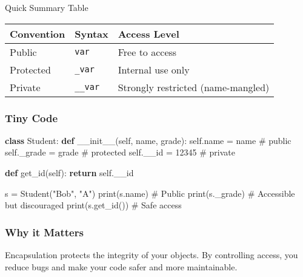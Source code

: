 \documentclass[
  letterpaper,
  DIV=11,
  numbers=noendperiod]{scrreprt}
\newenvironment{Shaded}{\begin{snugshade}}{\end{snugshade}}
\newcommand{\BuiltInTok}[1]{\textcolor[rgb]{0.00,0.23,0.31}{#1}}
\newcommand{\CommentTok}[1]{\textcolor[rgb]{0.37,0.37,0.37}{#1}}
\newcommand{\ControlFlowTok}[1]{\textcolor[rgb]{0.00,0.23,0.31}{\textbf{#1}}}
\newcommand{\DecValTok}[1]{\textcolor[rgb]{0.68,0.00,0.00}{#1}}
\newcommand{\FunctionTok}[1]{\textcolor[rgb]{0.28,0.35,0.67}{#1}}
\newcommand{\KeywordTok}[1]{\textcolor[rgb]{0.00,0.23,0.31}{\textbf{#1}}}
\newcommand{\NormalTok}[1]{\textcolor[rgb]{0.00,0.23,0.31}{#1}}
\newcommand{\OperatorTok}[1]{\textcolor[rgb]{0.37,0.37,0.37}{#1}}
\newcommand{\StringTok}[1]{\textcolor[rgb]{0.13,0.47,0.30}{#1}}
\newcommand{\VariableTok}[1]{\textcolor[rgb]{0.07,0.07,0.07}{#1}}
\begin{document}
Quick Summary Table

\begin{longtable}[]{@{}lll@{}}
\toprule\noalign{}
Convention & Syntax & Access Level \\
\midrule\noalign{}
\endhead
\bottomrule\noalign{}
\endlastfoot
Public & \texttt{var} & Free to access \\
Protected & \texttt{\_var} & Internal use only \\
Private & \texttt{\_\_var} & Strongly restricted (name-mangled) \\
\end{longtable}

\subsubsection{Tiny Code}\label{tiny-code-67}

\begin{Shaded}
\begin{Highlighting}[]
\KeywordTok{class}\NormalTok{ Student:}
    \KeywordTok{def} \FunctionTok{\_\_init\_\_}\NormalTok{(}\VariableTok{self}\NormalTok{, name, grade):}
        \VariableTok{self}\NormalTok{.name }\OperatorTok{=}\NormalTok{ name            }\CommentTok{\# public}
        \VariableTok{self}\NormalTok{.\_grade }\OperatorTok{=}\NormalTok{ grade         }\CommentTok{\# protected}
        \VariableTok{self}\NormalTok{.\_\_id }\OperatorTok{=} \DecValTok{12345}           \CommentTok{\# private}
    
    \KeywordTok{def}\NormalTok{ get\_id(}\VariableTok{self}\NormalTok{):}
        \ControlFlowTok{return} \VariableTok{self}\NormalTok{.\_\_id}

\NormalTok{s }\OperatorTok{=}\NormalTok{ Student(}\StringTok{"Bob"}\NormalTok{, }\StringTok{"A"}\NormalTok{)}
\BuiltInTok{print}\NormalTok{(s.name)       }\CommentTok{\# Public}
\BuiltInTok{print}\NormalTok{(s.\_grade)     }\CommentTok{\# Accessible but discouraged}
\BuiltInTok{print}\NormalTok{(s.get\_id())   }\CommentTok{\# Safe access}
\end{Highlighting}
\end{Shaded}

\subsubsection{Why it Matters}\label{why-it-matters-67}

Encapsulation protects the integrity of your objects. By controlling
access, you reduce bugs and make your code safer and more maintainable.
\end{document}
